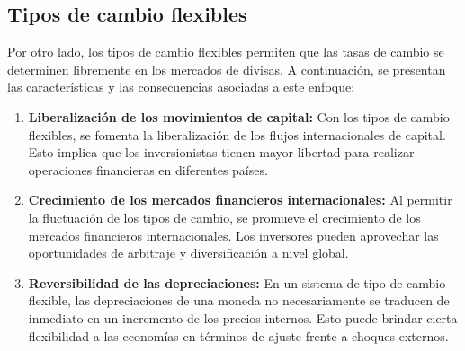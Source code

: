\documentclass[
  letterpaper,
  DIV=11,
  numbers=noendperiod]{scrartcl}
\begin{document}
\hypertarget{tipos-de-cambio-flexibles}{%
\subsection{Tipos de cambio flexibles}\label{tipos-de-cambio-flexibles}}

Por otro lado, los tipos de cambio flexibles permiten que las tasas de
cambio se determinen libremente en los mercados de divisas. A
continuación, se presentan las características y las consecuencias
asociadas a este enfoque:

\begin{enumerate}
\def\labelenumi{\arabic{enumi}.}
\item
  \textbf{Liberalización de los movimientos de capital:} Con los tipos
  de cambio flexibles, se fomenta la liberalización de los flujos
  internacionales de capital. Esto implica que los inversionistas tienen
  mayor libertad para realizar operaciones financieras en diferentes
  países.
\item
  \textbf{Crecimiento de los mercados financieros internacionales:} Al
  permitir la fluctuación de los tipos de cambio, se promueve el
  crecimiento de los mercados financieros internacionales. Los
  inversores pueden aprovechar las oportunidades de arbitraje y
  diversificación a nivel global.
\item
  \textbf{Reversibilidad de las depreciaciones:} En un sistema de tipo
  de cambio flexible, las depreciaciones de una moneda no necesariamente
  se traducen de inmediato en un incremento de los precios internos.
  Esto puede brindar cierta flexibilidad a las economías en términos de
  ajuste frente a choques externos.
\end{enumerate}


\printbibliography
\end{document}
